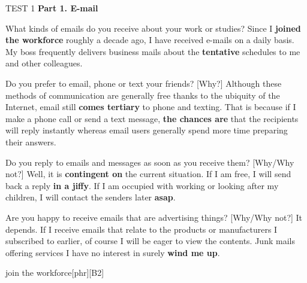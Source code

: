 \begin{glossarymc}[Cambridge 15]
    \begin{test}{TEST 1}
    \noindent
    \textbf{Part 1. E-mail}
    \begin{qa}{What kinds of emails do you receive about your work or studies?}
    Since I \textbf{joined the workforce} roughly a decade ago, I have received e-mails on a daily basis. My boss frequently delivers business mails about the \textbf{tentative} schedules to me and other colleagues.
    \end{qa}

    \begin{qa}{Do you prefer to email, phone or text your friends? [Why?]}
    Although these methods of communication are generally free thanks to the ubiquity of the Internet, email still \textbf{comes tertiary} to phone and texting. That is because if I make a phone call or send a text message, \textbf{the chances are} that the recipients will reply instantly whereas email users generally spend more time preparing their answers.
    \end{qa}

    \begin{qa}{Do you reply to emails and messages as soon as you receive them? [Why/Why not?]}
    Well, it is \textbf{contingent on} the current situation. If I am free, I will send back a reply \textbf{in a jiffy}. If I am occupied with working or looking after my children, I will contact the senders later \textbf{asap}.
    \end{qa}

    \begin{qa}{Are you happy to receive emails that are advertising things? [Why/Why not?]}
    It depends. If I receive emails that relate to the products or manufacturers I subscribed to earlier, of course I will be eager to view the contents. Junk mails offering services I have no interest in surely \textbf{wind me up}.
    \end{qa}

        \begin{VocabExplain}[Part 1]
            \begin{ExplainCard}{join the workforce}[phr][B2]
            \end{ExplainCard}


\end{VocabExplain}
\end{test}
\end{glossarymc}
